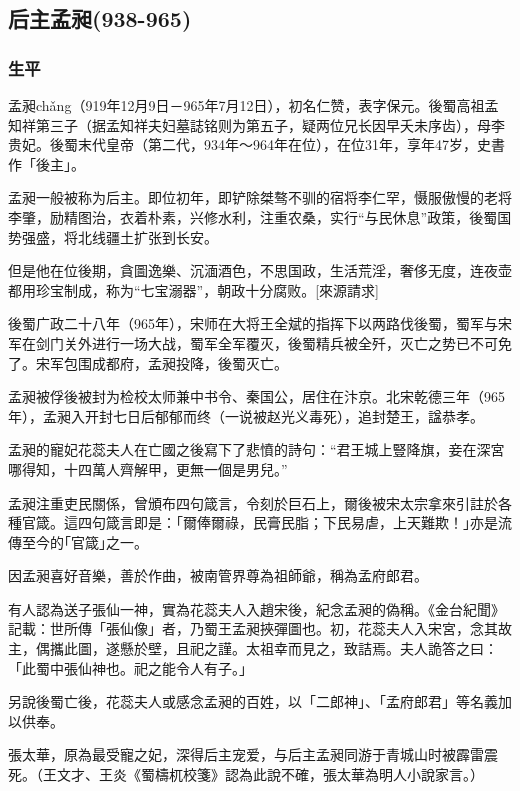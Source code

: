 
\subsection{后主孟昶\tiny(938-965)}

\subsubsection{生平}

孟昶chǎng（919年12月9日－965年7月12日），初名仁赞，表字保元。後蜀高祖孟知祥第三子（据孟知祥夫妇墓誌铭则为第五子，疑两位兄长因早夭未序齿），母李贵妃。後蜀末代皇帝（第二代，934年～964年在位），在位31年，享年47岁，史書作「後主」。

孟昶一般被称为后主。即位初年，即铲除桀骜不驯的宿将李仁罕，慑服傲慢的老将李肇，励精图治，衣着朴素，兴修水利，注重农桑，实行“与民休息”政策，後蜀国势强盛，将北线疆土扩张到长安。

但是他在位後期，貪圖逸樂、沉湎酒色，不思国政，生活荒淫，奢侈无度，连夜壶都用珍宝制成，称为“七宝溺器”，朝政十分腐败。[來源請求]

後蜀广政二十八年（965年），宋师在大将王全斌的指挥下以两路伐後蜀，蜀军与宋军在剑门关外进行一场大战，蜀军全军覆灭，後蜀精兵被全歼，灭亡之势已不可免了。宋军包围成都府，孟昶投降，後蜀灭亡。

孟昶被俘後被封为检校太师兼中书令、秦国公，居住在汴京。北宋乾德三年（965年），孟昶入开封七日后郁郁而终（一说被赵光义毒死），追封楚王，諡恭孝。

孟昶的寵妃花蕊夫人在亡國之後寫下了悲憤的詩句：“君王城上豎降旗，妾在深宮哪得知，十四萬人齊解甲，更無一個是男兒。”

孟昶注重吏民關係，曾頒布四句箴言，令刻於巨石上，爾後被宋太宗拿來引註於各種官箴。這四句箴言即是：｢爾俸爾祿，民膏民脂；下民易虐，上天難欺！｣亦是流傳至今的｢官箴｣之一。

因孟昶喜好音樂，善於作曲，被南管界尊為祖師爺，稱為孟府郎君。

有人認為送子張仙一神，實為花蕊夫人入趙宋後，紀念孟昶的偽稱。《金台紀聞》記載：世所傳「張仙像」者，乃蜀王孟昶挾彈圖也。初，花蕊夫人入宋宮，念其故主，偶攜此圖，遂懸於壁，且祀之謹。太祖幸而見之，致詰焉。夫人詭答之曰：「此蜀中張仙神也。祀之能令人有子。」

另說後蜀亡後，花蕊夫人或感念孟昶的百姓，以「二郎神」、「孟府郎君」等名義加以供奉。

張太華，原為最受寵之妃，深得后主宠爱，与后主孟昶同游于青城山时被霹雷震死。（王文才、王炎《蜀檮杌校箋》認為此說不確，張太華為明人小說家言。）

